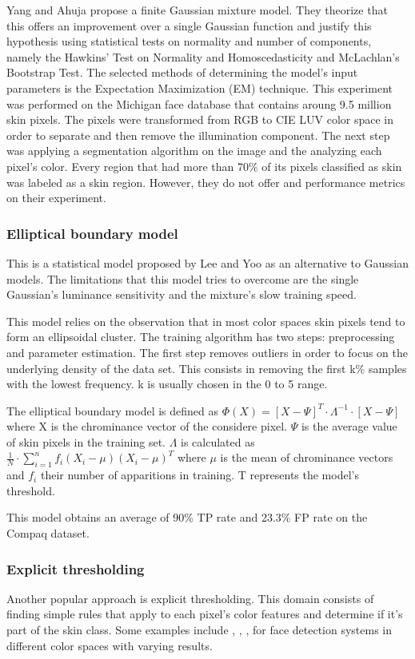 \documentclass[12pt]{report}
\begin{document}
	Yang and Ahuja\cite{Yang99gaussianmixture} propose a finite Gaussian mixture model. They theorize that this offers an improvement over a single Gaussian function and justify this hypothesis using statistical tests on normality and number of components, namely the Hawkins' Test on Normality and Homoscedasticity and McLachlan's Bootstrap Test. The selected methods of determining the model's input parameters is the Expectation Maximization (EM) technique. This experiment was performed on the Michigan face database that contains aroung 9.5 million skin pixels. The pixels were transformed from RGB to CIE LUV color space in order to separate and then remove the illumination component. The next step was applying a segmentation algorithm on the image and the analyzing each pixel's color. Every region that had more than 70\% of its pixels classified as skin was labeled as a skin region. However, they do not offer and performance metrics on their experiment.
	
	\subsubsection{Elliptical boundary model}
	This is a statistical model proposed by Lee and Yoo\cite{gaussian_applied} as an alternative to Gaussian models. The limitations that this model tries to overcome are the single Gaussian's luminance sensitivity and the mixture's slow training speed.
	
	This model relies on the observation\cite{Yang99gaussianmixture} that in most color spaces skin pixels tend to form an ellipsoidal cluster. The training algorithm has two steps: preprocessing and parameter estimation. The first step removes outliers in order to focus on the underlying density of the data set. This consists in removing the first k\% samples with the lowest frequency. k is usually chosen in the 0 to 5 range.
	
	The elliptical boundary model is defined as $ \Phi(X) = [X - \Psi]^T\cdot \Lambda^{-1} \cdot [X - \Psi]  $ where X is the chrominance vector of the considere pixel. $\Psi$ is the average value of skin pixels in the training set. $\Lambda$ is calculated as $ \frac{1}{N} \cdot \sum_{i=1}^{n}f_i(X_i-\mu)(X_i-\mu)^T$ where $\mu$ is the mean of chrominance vectors and $f_i$ their number of apparitions in training. T represents the model's threshold.
	
	This model obtains an average of 90\% TP rate and 23.3\% FP rate on the Compaq dataset.
	
	\subsubsection{Explicit thresholding}
	Another popular approach is explicit thresholding. This domain consists of finding simple rules that apply to each pixel's color features and determine if it's part of the skin class. Some examples include \cite{rgb_threshold}, \cite{cr_cb_threshold}, \cite{yiq_threshold}, \cite{i_threshold} for face detection systems in different color spaces with varying results. 
 	
\end{document}
